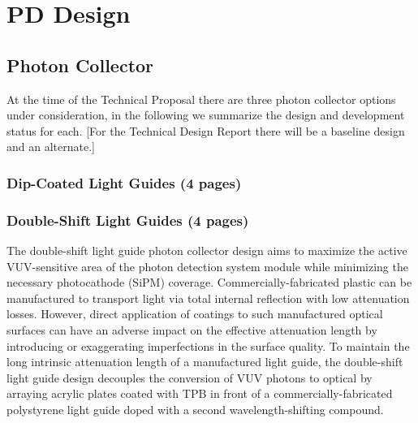 \section{PD Design}
\label{sec:fdsp-pd-design}



\subsection{Photon Collector}
\label{sec:fdsp-pd-pc}

At the time of the Technical Proposal there are three photon collector options  under consideration, 
in the following we summarize the design and development status for each. 
[For the Technical Design Report there will be a baseline design and an alternate.]

\subsubsection{Dip-Coated Light Guides (4 pages)}
\label{ssec:fdsp-pd-pc-bar1}

\subsubsection{Double-Shift Light Guides (4 pages)}
\label{ssec:fdsp-pd-pc-bar2}
The double-shift light guide photon collector design aims to maximize the active VUV-sensitive 
area of the photon detection system module while minimizing the necessary photocathode (SiPM) 
coverage. 
Commercially-fabricated plastic can be manufactured to transport light via total internal 
reflection with low attenuation losses. However, direct application of coatings to such
 manufactured optical surfaces can have an adverse impact on the effective attenuation length 
by introducing or exaggerating imperfections in the surface quality. 
To maintain the long intrinsic attenuation length of a manufactured light guide, the 
double-shift light guide design decouples the conversion of VUV photons to optical by
 arraying acrylic plates coated with TPB in front of a commercially-fabricated polystyrene 
light guide doped with a second wavelength-shifting compound.

